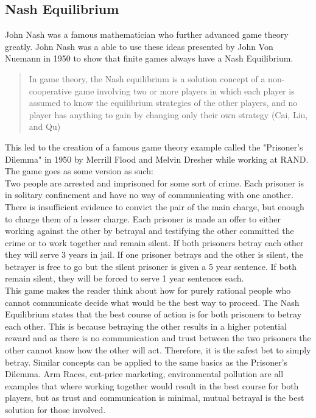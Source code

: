 \documentclass[12pt]{article}
\begin{document}
	\subsection{Nash Equilibrium}
	 John Nash was a famous mathematician who further advanced game theory greatly. John Nash was a able to use these ideas presented by John Von Nuemann in 1950 to show that finite games always have a Nash Equilibrium. 
	 \begin{quotation}
		In game theory, the Nash equilibrium is a solution concept of a non-cooperative game involving two or more players in which each player is assumed to know the equilibrium strategies of the other players, and no player has anything to gain by changing only their own strategy (Cai, Liu, and Qu)
 	\end{quotation}
 	This led to the creation of a famous game theory example called the "Prisoner's Dilemma" in 1950 by Merrill Flood and Melvin Dresher while working at RAND. The game goes as some version as such: \\
 		Two people are arrested and imprisoned for some sort of crime. Each prisoner is in solitary confinement and have no way of communicating with one another. There is insufficient evidence to convict the pair of the main charge, but enough to charge them of a lesser charge. Each prisoner is made an offer to either working against the other by betrayal and testifying the other committed the crime or to work together and remain silent. If both prisoners betray each other they will serve 3 years in jail. If one prisoner betrays and the other is silent, the betrayer is free to go but the silent prisoner is given a 5 year sentence. If both remain silent, they will be forced to serve 1 year sentences each.\\
 	This game makes the reader think about how for purely rational people who cannot communicate decide what would be the best way to proceed.
 	The Nash Equilibrium states that the best course of action is for both prisoners to betray each other. This is because betraying the other results in a higher potential reward and as there is no communication and trust between the two prisoners the other cannot know how the other will act. Therefore, it is the safest bet to simply betray. Similar concepts can be applied to the same basics as the Prisoner's Dilemma. Arm Races, cut-price marketing, environmental pollution are all examples that where working together would result in the best course for both players, but as trust and communication is minimal, mutual betrayal is the best solution for those involved.  
\end{document}

